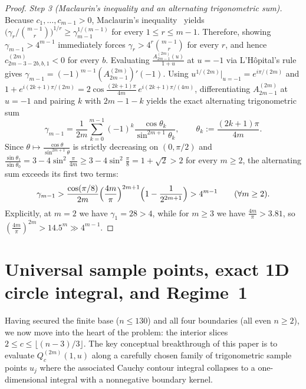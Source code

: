 \documentclass[10pt]{article}
\numberwithin{equation}{section}
\theoremstyle{plain}
\theoremstyle{definition}
\newcommand{\1}{\mathbf{1}}
\begin{document}
\begin{proof}
\emph{Step 3 (Maclaurin's inequality and an alternating trigonometric sum).} Because $c_1, \dots, c_{m-1} > 0$, Maclaurin's inequality~\cite{HLP1952} yields $\bigl(\gamma_r / \binom{m-1}{r}\bigr)^{1/r} \ge \gamma_{m-1}^{1/(m-1)}$ for every $1 \le r \le m - 1$. Therefore, showing $\gamma_{m-1} > 4^{m-1}$ immediately forces $\gamma_r > 4^r\binom{m-1}{r}$ for every $r$, and hence $c_{2m-3-2b, b, 1}^{(2m)} < 0$ for every $b$. Evaluating $\frac{A_{2m-1}^{(2m)}(u)}{1 + u}$ at $u = -1$ via L'H\^opital's rule gives $\gamma_{m-1} = (-1)^{m-1}(A_{2m-1}^{(2m)})'(-1)$. Using $u^{1/(2m)}\big|_{u=-1} = e^{i\pi/(2m)}$ and $1 + e^{i(2k+1)\pi/(2m)} = 2\cos\frac{(2k+1)\pi}{4m}\, e^{i(2k+1)\pi/(4m)}$, differentiating $A_{2m-1}^{(2m)}$ at $u = -1$ and pairing $k$ with $2m - 1 - k$ yields the exact alternating trigonometric sum
\begin{equation}\label{eq:gamma-trig}
\gamma_{m - 1} = \frac{1}{2m}\sum_{k=0}^{m-1} (-1)^k \frac{\cos\theta_k}{\sin^{2m+1}\theta_k}, \qquad \theta_k := \frac{(2k + 1)\pi}{4m}.
\end{equation}
Since $\theta \mapsto \frac{\cos\theta}{\sin^{2m+1}\theta}$ is strictly decreasing on $(0, \pi/2)$ and $\frac{\sin\theta_1}{\sin\theta_0} = 3 - 4\sin^2\frac{\pi}{4m} \ge 3 - 4\sin^2\frac{\pi}{8} = 1 + \sqrt{2} > 2$ for every $m \ge 2$, the alternating sum exceeds its first two terms:
\[
\gamma_{m - 1} > \frac{\cos(\pi/8)}{2m}\Bigl(\frac{4m}{\pi}\Bigr)^{2m + 1}\Bigl(1 - \frac{1}{2^{2m + 1}}\Bigr) > 4^{m - 1} \qquad (\forall m \ge 2).
\]
Explicitly, at $m = 2$ we have $\gamma_1 = 28 > 4$, while for $m \ge 3$ we have $\frac{4m}{\pi} > 3.81$, so $(\frac{4m}{\pi})^{2m} > 14.5^m \gg 4^{m-1}$.
\end{proof}

\section{Universal sample points, exact 1D circle integral, and Regime~1}
\label{sec:regime1}

Having secured the finite base ($n \le 130$) and all four boundaries (all even $n \ge 2$), we now move into the heart of the problem: the interior slices $2 \le c \le \lfloor (n - 3)/3 \rfloor$. The key conceptual breakthrough of this paper is to evaluate $Q_c^{(2m)}(1, u)$ along a carefully chosen family of trigonometric sample points $u_j$ where the associated Cauchy contour integral collapses to a one-dimensional integral with a nonnegative boundary kernel.
\end{document}

